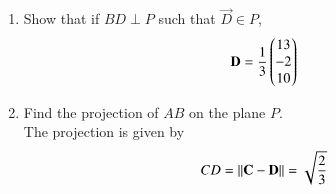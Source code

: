 \documentclass[journal,12pt,twocolumn]{IEEEtran}
\renewcommand\thesection{\arabic{section}}
\begin{document}
\begin{enumerate}[label=\thesection.\arabic*
,ref=\thesection.\theenumi]
\begin{equation}
\end{equation}
Substituting in \eqref{eq:Pproj}
\begin{align}
 \myvec{1 & 1 & 1}\myvec{5 \\ -1 \\ 4} + \lambda \myvec{1 & 1 & 1}
\myvec{1 \\ 1 \\ 1} &= 7
\\
\implies 8 + 3\lambda_1 &= 7
\\
\implies \lambda_1 &= -\frac{1}{3}
\end{align}
Thus,
\begin{align}
\vec{C} = \frac{1}{3}\myvec{14 \\ -4 \\ 11}
\end{align}
\item Show that if $BD \perp P$  such that $\vec{D} \in P$,
\begin{equation}
\mathbf{D} = \frac{1}{3}\begin{pmatrix}13 \\ -2 \\ 10\end{pmatrix}
\end{equation}
%
\item Find the projection of $AB$ on the plane $P$.
\\
\solution The projection is given by
\begin{align}
CD = \lVert\mathbf{C}-\mathbf{D}\rVert = \sqrt{\frac{2}{3}}
\end{align}
\end{enumerate}
\end{document}
